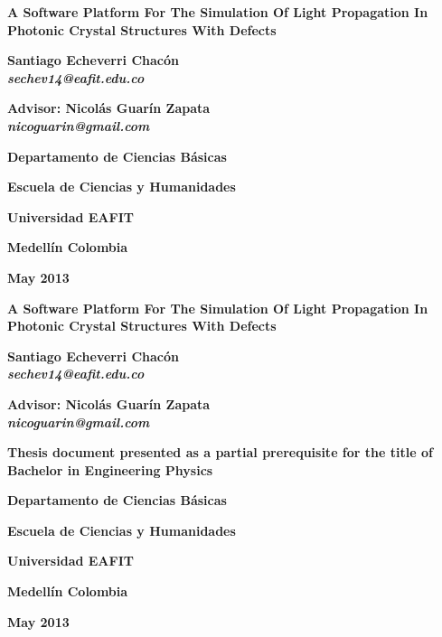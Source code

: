 \documentclass[office, 10pt]{book}
\makeatletter
\newcommand\portada{
\begin{titlepage}
		\begin{center}
			{\large \bf  A Software Platform For The Simulation Of Light Propagation In Photonic Crystal Structures With Defects}
			\vfill
			{\large\bf Santiago Echeverri Chacón
			\\\emph{sechev14@eafit.edu.co}\par}
			{\large\bf Advisor: Nicolás Guarín Zapata
			\\\emph{nicoguarin@gmail.com}}
			\vfill
								\vfill
			{\large\bf Departamento de Ciencias Básicas \par}
			{\large\bf Escuela de Ciencias y Humanidades \par}
			{\large\bf Universidad EAFIT \par}
			{\large\bf Medellín Colombia\par}
			{\large\bf May 2013 \par}
		\end{center}
\end{titlepage}
}
\newcommand\contraportada{
	\begin{titlepage}
		\begin{center}
			{\large \bf A Software Platform For The Simulation Of Light Propagation In Photonic Crystal Structures With Defects} 
			\vfill
			{\large\bf Santiago Echeverri Chacón
			\\\emph{sechev14@eafit.edu.co}\par}
			{\large\bf Advisor: Nicolás Guarín Zapata
			\\\emph{nicoguarin@gmail.com}}
			\vfill
			{\large\bf Thesis document presented as a partial prerequisite for the title of Bachelor in Engineering Physics \par}
			\vfill
					\vfill
			{\large\bf Departamento de Ciencias Básicas \par}
			{\large\bf Escuela de Ciencias y Humanidades \par}
			{\large\bf Universidad EAFIT \par}
			{\large\bf Medellín Colombia\par}
			{\large\bf May 2013 \par}
		\end{center}
\end{titlepage}
}
\makeatother
\begin{document}
\portada
\contraportada

\tableofcontents
\clearpage

















\end{document}

